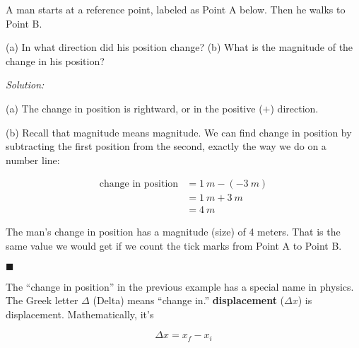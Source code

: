 \documentclass[dvipsnames]{article}
\begin{document}
\begin{example} \label{T7uFg}
A man starts at a reference point, labeled as Point A below. Then he walks to Point B. 

\begin{center}
\end{center}

(a) In what direction did his position change? (b) What is the magnitude of the change in his position?
\end{example}

\textit{Solution:}

(a) The change in position is rightward, or in the positive ($+$) direction.

(b) Recall that magnitude means \glsdesc{magnitude}. We can find change in position by subtracting the first position from the second, exactly the way we do on a number line:

\vspace{-1em}
\begin{align*}
    \text{change in position} &= \SI{1}{m} - \left(-\SI{3}{m}\right) \\[1ex]
    &= \SI{1}{m} + \SI{3}{m} \\[1ex]
    &= \boxed{\SI{4}{m}}
\end{align*}

The man's change in position has a magnitude (size) of 4 meters. That is the same value we would get if we count the tick marks from Point A to Point B.

\hfill $\blacksquare$

The ``change in position'' in the previous example has a special name in physics. The Greek letter $\Delta$ (Delta) means ``change in.'' \textbf{\Gls{displacement}} ($\Delta x$) is \glsdesc{displacement}. Mathematically, it's

\begin{equation}
    \Delta x = x_f - x_i
\end{equation}
\end{document}
